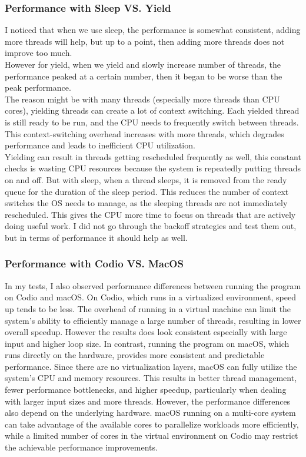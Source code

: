 \documentclass[letterpaper,12pt]{article}
\theoremstyle{remark}
\begin{document}
\subsubsection{Performance with Sleep VS. Yield}
I noticed that when we use sleep, the performance is somewhat consistent, adding more threads will help, but up to a point, then adding more threads does not improve too much.\\
However for yield, when we yield and slowly increase number of threads, the performance peaked at a certain number, then it began to be worse than the peak performance. \\
The reason might be with many threads (especially more threads than CPU cores), yielding threads can create a lot of context switching. Each yielded thread is still ready to be run, and the CPU needs to frequently switch between threads. This context-switching overhead increases with more threads, which degrades performance and leads to inefficient CPU utilization.\\
 Yielding can result in threads getting rescheduled frequently as well, this constant checks is wasting CPU resources because the system is repeatedly putting threads on and off.
 But with sleep, when a thread sleeps, it is removed from the ready queue for the duration of the sleep period. This reduces the number of context switches the OS needs to manage, as the sleeping threads are not immediately rescheduled. This gives the CPU more time to focus on threads that are actively doing useful work.
I did not go through the backoff strategies and test them out, but in terms of performance it should help as well.\\

\subsubsection{Performance with Codio VS. MacOS}
In my tests, I also observed performance differences between running the program on Codio and macOS. On Codio, which runs in a virtualized environment, speed up tends to be less. The overhead of running in a virtual machine can limit the system's ability to efficiently manage a large number of threads, resulting in lower overall speedup. However the results does look consistent especially with large input and higher loop size.
In contrast, running the program on macOS, which runs directly on the hardware, provides more consistent and predictable performance. Since there are no virtualization layers, macOS can fully utilize the system’s CPU and memory resources. This results in better thread management, fewer performance bottlenecks, and higher speedup, particularly when dealing with larger input sizes and more threads.
However, the performance differences also depend on the underlying hardware. macOS running on a multi-core system can take advantage of the available cores to parallelize workloads more efficiently, while a limited number of cores in the virtual environment on Codio may restrict the achievable performance improvements.
\end{document}
